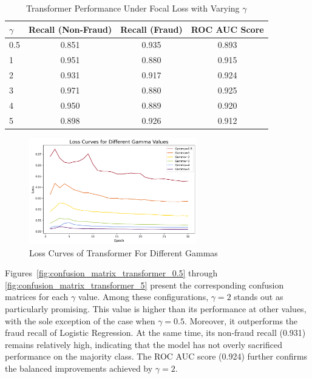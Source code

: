 \documentclass[11pt, oneside]{article}   	%
\begin{document}
\begin{table}[h]
\centering
\caption{Transformer Performance Under Focal Loss with Varying \(\gamma\)}
\label{tab:focal_gamma}
\begin{tabular}{lccc}
\hline
\(\gamma\) & Recall (Non-Fraud) & Recall (Fraud) & ROC AUC Score \\
\hline
0.5 & 0.851 & 0.935 & 0.893 \\
1   & 0.951 & 0.880 & 0.915 \\
2   & 0.931 & 0.917 & 0.924 \\
3   & 0.971 & 0.880 & 0.925 \\
4   & 0.950 & 0.889 & 0.920 \\
5   & 0.898 & 0.926 & 0.912 \\
\hline
\end{tabular}
\end{table}

\begin{figure}[H]
    \centering
    \includegraphics[width=0.65\textwidth]{images/loss_curves_transformer.png}
    \caption{Loss Curves of Transformer For Different Gammas}
    \label{fig:loss_curves_transformer}
\end{figure}

Figures~\ref{fig:confusion_matrix_transformer_0.5} through \ref{fig:confusion_matrix_transformer_5} present the corresponding confusion matrices for each \(\gamma\) value. Among these configurations, \(\gamma = 2\) stands out as particularly promising. This value is higher than its performance at other values, with the sole exception of the case when \(\gamma = 0.5\). Moreover, it outperforms the fraud recall of Logistic Regression. At the same time, its non-fraud recall (0.931) remains relatively high, indicating that the model has not overly sacrificed performance on the majority class. The ROC AUC score (0.924) further confirms the balanced improvements achieved by \(\gamma = 2\).
\end{document}

